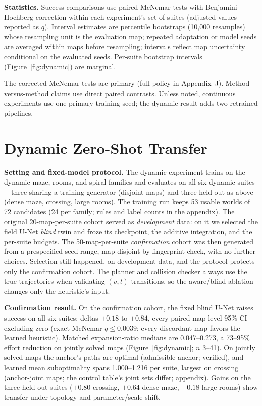 \documentclass[letterpaper]{article} %
\begin{document}
\enlargethispage{-\baselineskip}%
\textbf{Statistics.}  Success comparisons use paired McNemar tests with Benjamini--Hochberg correction within each experiment's set of suites (adjusted values reported as $q$). Interval estimates are percentile bootstraps (10{,}000 resamples) whose resampling unit is the evaluation map; repeated adaptation or model seeds are averaged within maps before resampling; intervals reflect map uncertainty conditional on the evaluated seeds. Per-suite bootstrap intervals (Figure~\ref{fig:dynamic}) are marginal.

The corrected McNemar tests are primary (full policy in Appendix~J). Method-versus-method claims use direct paired contrasts. Unless noted, continuous experiments use one primary training seed; the dynamic result adds two retrained pipelines.

\section{Dynamic Zero-Shot Transfer}

\textbf{Setting and fixed-model protocol.} The dynamic experiment trains on the dynamic maze, rooms, and spiral families and evaluates on all six dynamic suites---three sharing a training generator (disjoint maps) and three held out as above (dense maze, crossing, large rooms). The training run keeps 53 usable worlds of 72 candidates (24 per family; rules and label counts in the appendix). The original 20-map-per-suite cohort served as \emph{development} data: on it we selected the field U-Net \emph{blind} twin and froze its checkpoint, the additive integration, and the per-suite budgets. The 50-map-per-suite \emph{confirmation} cohort was then generated from a prespecified seed range, map-disjoint by fingerprint check, with no further choices. Selection still happened, on development data, and the protocol protects only the confirmation cohort. The planner and collision checker always use the true trajectories when validating $(v,t)$ transitions, so the aware/blind ablation changes only the heuristic's input.

\textbf{Confirmation result.} On the confirmation cohort, the fixed blind U-Net raises success on all six suites: deltas $+0.18$ to $+0.84$, every paired map-level 95\% CI excluding zero (exact McNemar $q \leq 0.0039$; every discordant map favors the learned heuristic). Matched expansion-ratio medians are 0.047--0.273, a 73--95\% effort reduction on jointly solved maps (Figure~\ref{fig:dynamic}; $n$ 3--41). On jointly solved maps the anchor's paths are optimal (admissible anchor; verified), and learned mean suboptimality spans 1.000--1.216 per suite, largest on crossing (anchor-joint maps; the control table's joint sets differ; appendix). Gains on the three held-out suites ($+0.80$ crossing, $+0.64$ dense maze, $+0.18$ large rooms) show transfer under topology and parameter/scale shift.
\end{document}
